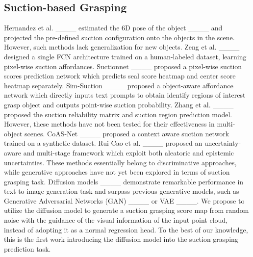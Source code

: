 \subsection{Suction-based Grasping} 
Hernandez et al. ____ estimated the 6D pose of the object ____ and projected the pre-defined suction configuration onto the objects in the scene. However, such methods lack generalization for new objects. Zeng et al. ____ designed a single FCN architecture trained on a human-labeled dataset, learning pixel-wise suction affordances. Suctionnet ____ proposed a pixel-wise suction scores prediction network which predicts seal score heatmap and center score heatmap separately. Sim-Suction ____ proposed a object-aware affordance network which directly inputs text prompts to obtain identify regions of interest grasp object and outputs point-wise suction probability. Zhang et al. ____ proposed the suction reliability matrix and suction region prediction model. However, these methods have not been tested for their effectiveness in multi-object scenes. CoAS-Net ____ proposed a context aware suction network trained on a synthetic dataset. Rui Cao et al. ____ proposed an uncertainty-aware and multi-stage framework which exploit both aleatoric and epistemic uncertainties. These methods essentially belong to discriminative approaches, while generative approaches have not yet been explored in terms of suction grasping task. Diffusion models ____ demonstrate remarkable performance in text-to-image generation task and surpass previous generative models, such as Generative Adversarial Networks (GAN) ____ or VAE ____. We propose to utilize the diffusion model to generate a suction grasping score map from random noise with the guidance of the visual information of the input point cloud, instead of adopting it as a normal regression head. To the best of our knowledge, this is the first work introducing the diffusion model into the suction grasping prediction task.

